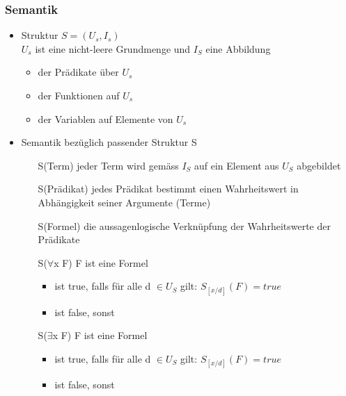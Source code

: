 \documentclass[a4paper,10pt]{article}
\begin{document}
\subsubsection{Semantik}
\begin{itemize}
	\item Struktur $S = (U_s, I_s)$ \\
		$U_s$ ist eine nicht-leere Grundmenge und $I_S$ eine Abbildung
		\begin{itemize}
			\item der Pr\"adikate \"uber $U_s$
			\item der Funktionen auf $U_s$
			\item der Variablen auf Elemente von $U_s$
		\end{itemize}
	\item Semantik bez\"uglich passender Struktur S
		\begin{itemize}
			\item[S(Term)] jeder Term wird gem\"ass $I_S$ auf ein Element aus $U_S$ abgebildet
			\item[S(Pr\"adikat)] jedes Pr\"adikat bestimmt einen Wahrheitswert in Abh\"angigkeit seiner Argumente (Terme)
			\item[S(Formel)] die aussagenlogische Verkn\"upfung der Wahrheitswerte der Pr\"adikate
			\item[S($\forall$x F)] F ist eine Formel 
				\begin{itemize}
					\item ist true, falls f\"ur alle d $\in U_S$ gilt: $S_{[x/d]}(F) = true$
					\item ist false, sonst
				\end{itemize}
			\item[S($\exists$x F)] F ist eine Formel
				\begin{itemize}
					\item ist true, falls f\"ur alle d $\in U_S$ gilt: $S_{[x/d]}(F) = true$
					\item ist false, sonst
				\end{itemize}
		\end{itemize}
\end{itemize}
\end{document}
